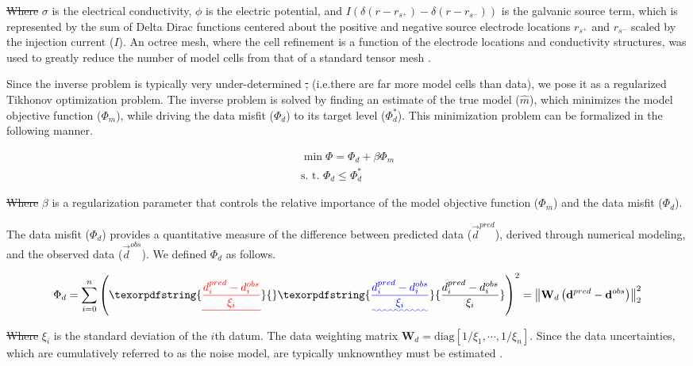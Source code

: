 \documentclass[preprint,authoryear,12pt]{elsarticle}
\providecommand{\DIFaddtex}[1]{{\protect\color{blue}\uwave{#1}}} %
\providecommand{\DIFdeltex}[1]{{\protect\color{red}\sout{#1}}}                      %
\providecommand{\DIFaddbegin}{} %
\providecommand{\DIFaddend}{} %
\providecommand{\DIFdelbegin}{} %
\providecommand{\DIFdelend}{} %
\providecommand{\DIFadd}[1]{\texorpdfstring{\DIFaddtex{#1}}{#1}} %
\providecommand{\DIFdel}[1]{\texorpdfstring{\DIFdeltex{#1}}{}} %
\begin{document}
\noindent \DIFdelbegin \DIFdel{Where }\DIFdelend \DIFaddbegin \DIFadd{where }\DIFaddend $\sigma$ is the electrical conductivity, $\phi$ is the electric potential, and $I(\delta(r - r_{s^{+}}) - \delta(r - r_{s^{-}}))$ is the galvanic source term, which is represented by the sum of Delta Dirac functions centered about the positive and negative source electrode locations $r_{s^{+}}$ and $r_{s^{-}}$ scaled by the injection current ($I$). An octree mesh, where the cell refinement is a function of the electrode locations and conductivity structures, was used to greatly reduce the number of model cells from that of a standard tensor mesh \citep{Haber2007,Haber2012}.

Since the inverse problem is typically very under-determined \DIFdelbegin \DIFdel{, }\DIFdelend (i.e.\DIFaddbegin \DIFadd{, }\DIFaddend there are far more model cells than data), we pose it as a regularized Tikhonov optimization problem. The inverse problem is solved by finding an estimate of the true model ($\widehat{m}$), which minimizes the model objective function ($\Phi_m$), while driving the data misfit ($\Phi_d$) to its target level ($\Phi_{d}^*$).  This minimization problem can be formalized in the following manner.

\begin{eqnarray}
  \label{eq:globphi}
  \min \Phi = \Phi_d+\beta\Phi_m \\
  \mbox{s. t. } \Phi_{d} \leq \Phi_{d}^* \nonumber
\end{eqnarray}

\noindent \DIFdelbegin \DIFdel{Where }\DIFdelend \DIFaddbegin \DIFadd{where }\DIFaddend $\beta$ is a regularization parameter that controls the relative importance of the model objective function ($\Phi_{m}$) and the data misfit ($\Phi_{d}$).

The data misfit ($\Phi_{d}$) provides a quantitative measure of the difference between predicted data ($\vec{d}^{pred}$), derived through numerical modeling, and the observed data ($\vec{d}^{obs}$). We defined $\Phi_{d}$ as follows.

\begin{equation}
  \Phi_d = \sum^{n}_{i=0}\left(\DIFdelbegin \DIFdel{\frac{d^{pred}_i-d^{obs}_i}{\xi_i}}\DIFdelend \DIFaddbegin \DIFadd{\frac{d^{pred}_i - d^{obs}_i}{\xi_i}}\DIFaddend \right)^2 = \left\|\mathbf{W}_{d}\left(\mathbf{d}^{pred} - \mathbf{d}^{obs}\right)\right\|_2^2
  \label{eq:Phi_d}
\end{equation}

\noindent \DIFdelbegin \DIFdel{Where }\DIFdelend \DIFaddbegin \DIFadd{where }\DIFaddend $\xi_{i}$ is the standard deviation of the $i$th datum. The data weighting matrix $\mathbf{W}_{d} = \text{diag}\left[1/\xi_{1}, \cdots, 1/\xi_{n}\right]$. Since the data uncertainties, which are cumulatively referred to as the noise model, are typically unknown\DIFaddbegin \DIFadd{, }\DIFaddend they must be estimated \citep{Oldenburg2005}.
\end{document}
